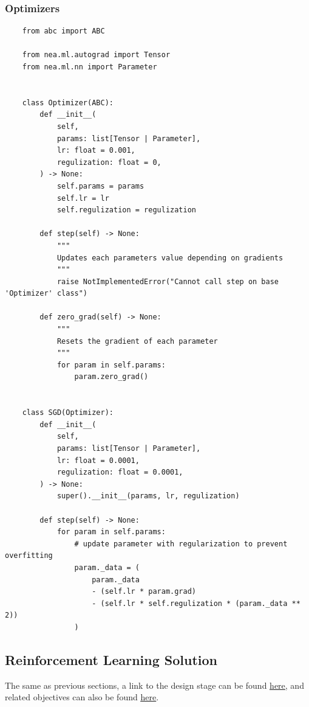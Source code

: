 \documentclass{article}
\newcommand{\myhy}[2]{\hyperref[#1]{\color{black}\setulcolor{black}\ul{#2}}}
\begin{document}
    \subsubsection{Optimizers}
    \begin{verbatim}
    from abc import ABC

    from nea.ml.autograd import Tensor
    from nea.ml.nn import Parameter


    class Optimizer(ABC):
        def __init__(
            self,
            params: list[Tensor | Parameter],
            lr: float = 0.001,
            regulization: float = 0,
        ) -> None:
            self.params = params
            self.lr = lr
            self.regulization = regulization

        def step(self) -> None:
            """
            Updates each parameters value depending on gradients
            """
            raise NotImplementedError("Cannot call step on base 'Optimizer' class")

        def zero_grad(self) -> None:
            """
            Resets the gradient of each parameter
            """
            for param in self.params:
                param.zero_grad()


    class SGD(Optimizer):
        def __init__(
            self,
            params: list[Tensor | Parameter],
            lr: float = 0.0001,
            regulization: float = 0.0001,
        ) -> None:
            super().__init__(params, lr, regulization)

        def step(self) -> None:
            for param in self.params:
                # update parameter with regularization to prevent overfitting
                param._data = (
                    param._data
                    - (self.lr * param.grad)
                    - (self.lr * self.regulization * (param._data ** 2))
                )
    \end{verbatim}

    \subsection{Reinforcement Learning Solution}
    The same as previous sections, a link to the design stage can be found \myhy{RLSDesignStage}{here}, and
    related objectives can also be found \myhy{RLS Objs}{here}.
\end{document}
